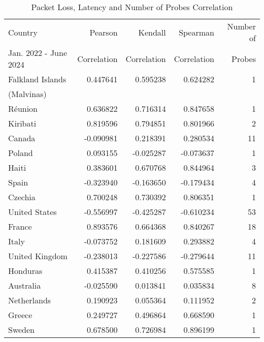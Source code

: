 \begin{table}[ht]
	\caption{Packet Loss, Latency and Number of Probes Correlation}
	\label{fig:packetloss-latency-number-probes-correlation}
	\begin{tabular}{lrrrr}
		\toprule
		Country               & Pearson     & Kendall     & Spearman    & Number of \\
		Jan. 2022 - June 2024 & Correlation & Correlation & Correlation & Probes    \\
		\midrule
		Falkland Islands      & 0.447641    & 0.595238    & 0.624282    & 1         \\
		(Malvinas)                                                                  \\
		Réunion               & 0.636822    & 0.716314    & 0.847658    & 1         \\
		Kiribati              & 0.819596    & 0.794851    & 0.801966    & 2         \\
		Canada                & -0.090981   & 0.218391    & 0.280534    & 11        \\
		Poland                & 0.093155    & -0.025287   & -0.073637   & 1         \\
		Haiti                 & 0.383601    & 0.670768    & 0.844964    & 3         \\
		Spain                 & -0.323940   & -0.163650   & -0.179434   & 4         \\
		Czechia               & 0.700248    & 0.730392    & 0.806351    & 1         \\
		United States         & -0.556997   & -0.425287   & -0.610234   & 53        \\
		France                & 0.893576    & 0.664368    & 0.840267    & 18        \\
		Italy                 & -0.073752   & 0.181609    & 0.293882    & 4         \\
		United Kingdom        & -0.238013   & -0.227586   & -0.279644   & 11        \\
		Honduras              & 0.415387    & 0.410256    & 0.575585    & 1         \\
		Australia             & -0.025590   & 0.013841    & 0.035834    & 8         \\
		Netherlands           & 0.190923    & 0.055364    & 0.111952    & 2         \\
		Greece                & 0.249727    & 0.496864    & 0.668590    & 1         \\
		Sweden                & 0.678500    & 0.726984    & 0.896199    & 1         \\

\end{tabular}
\end{table}
